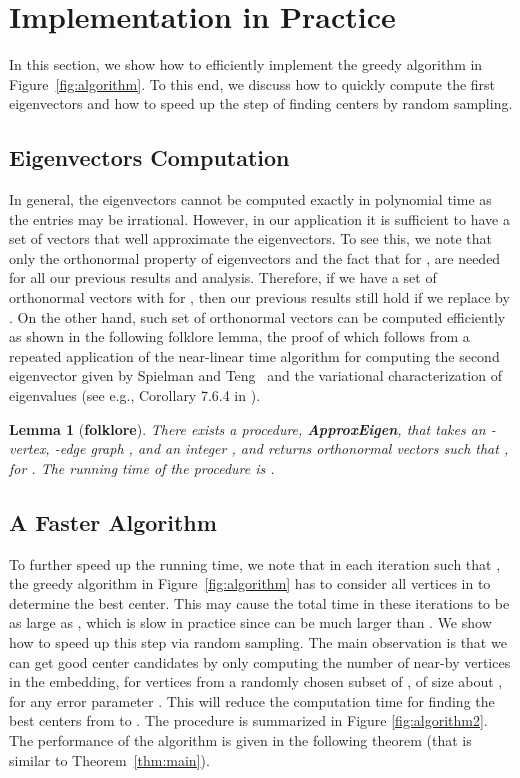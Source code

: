 \documentclass[11pt]{article}
\theoremstyle{plain}
\newtheorem{lemma}[theorem]{Lemma}
\begin{document}
\section{Implementation in Practice}\label{fast-algo}
In this section, we show how to efficiently implement the greedy algorithm in
Figure~\ref{fig:algorithm}. To this end, we discuss how to quickly compute the
first  eigenvectors and how to speed up the step of finding centers by random
sampling.

\subsection{Eigenvectors Computation} In general, the eigenvectors cannot be
computed exactly in polynomial time as the entries may be irrational. However,
in our application it is sufficient to have a set of vectors that well
approximate the eigenvectors. To see this, we note that only the orthonormal
property of eigenvectors  and the fact that for ,  are needed for
all our previous results and analysis. Therefore, if we have a set of 
orthonormal vectors  with
 for , then our previous results still hold if we replace  by
. On the other hand, such set of  orthonormal vectors can be
computed efficiently as shown in the following folklore lemma, the proof of
which follows from a repeated application of the near-linear time algorithm for
computing the second eigenvector given by Spielman and Teng~\cite{DBLP:journals/siammax/SpielmanT14}
and the variational characterization of eigenvalues (see e.g., Corollary 7.6.4
in \cite{Ove14:rounding}).

\begin{lemma}[\bf{folklore}]\label{lem:approx-eigen}
There exists a procedure, \textup{\textbf{ApproxEigen}}, that takes an
-vertex, -edge graph , and an integer , and returns 
orthonormal vectors  such that
, for . The running time of the procedure is .
\end{lemma}

\subsection{A Faster Algorithm}\label{sec:fast-algorithm}
To further speed up the running time, we note that in each iteration  such that , the greedy algorithm in Figure~\ref{fig:algorithm} has to consider all vertices in  to determine the best center.
This may cause the total time in these iterations to be as large as , which is slow in practice since  can be much larger than .
We show how to speed up this step via random sampling.
The main observation is that we can get good center candidates by only computing the number of near-by vertices in the embedding, for vertices from a randomly chosen subset  of , of size about , for any error parameter .
This will reduce the computation time for finding the best centers from  to .
The procedure is summarized in Figure \ref{fig:algorithm2}.
The performance of the algorithm is given in the following theorem (that is similar to Theorem~\ref{thm:main}).
\end{document}
